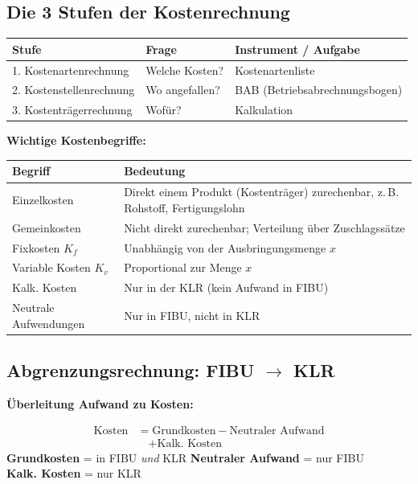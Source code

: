 \documentclass[10pt,a4paper]{article}
\begin{document}
\begin{multicols}{2}

\subsection{Die 3 Stufen der Kostenrechnung}

{\small
\begin{tabular}{|L{2.3cm}|L{1.7cm}|L{3.2cm}|}
\hline
{}
\textbf{Stufe} & \textbf{Frage} & \textbf{Instrument / Aufgabe} \\
. Kostenartenrechnung & Welche Kosten? & Kostenarten\-liste \\
. Kostenstellenrechnung & Wo angefallen? & BAB (Betriebsabrechnungsbogen) \\
. Kostenträgerrechnung & Wofür? & Kalkulation \\
\hline
\end{tabular}
}

\vspace{4pt}
\textbf{Wichtige Kostenbegriffe:}

\begin{tabular}{|L{2.5cm}|L{4.5cm}|}
\hline
{}
\textbf{Begriff} & \textbf{Bedeutung} \\
\hline
Einzelkosten & Direkt einem Produkt (Kostenträger) zurechenbar, z.\,B. Rohstoff, Fertigungslohn \\
\hline
Gemeinkosten & Nicht direkt zurechenbar; Verteilung über Zuschlagssätze \\
\hline
Fixkosten $K_f$ & Unabhängig von der Ausbringungsmenge $x$ \\
\hline
Variable Kosten $K_v$ & Proportional zur Menge $x$ \\
\hline
Kalk. Kosten & Nur in der KLR (kein Aufwand in FIBU) \\
\hline
Neutrale Aufwendungen & Nur in FIBU, nicht in KLR \\
\hline
\end{tabular}

\columnbreak

\subsection{Abgrenzungsrechnung: FIBU $\to$ KLR}

\textbf{Überleitung Aufwand zu Kosten:}

\begin{formelbox}
\begin{align*}
\text{Kosten} &= \text{Grundkosten} - \text{Neutraler Aufwand}\\
              &\quad + \text{Kalk. Kosten}
\end{align*}
{\footnotesize
\textbf{Grundkosten} = in FIBU \textit{und} KLR \quad
\textbf{Neutraler Aufwand} = nur FIBU\\
\textbf{Kalk. Kosten} = nur KLR}
\end{formelbox}


\end{multicols}
\end{document}
